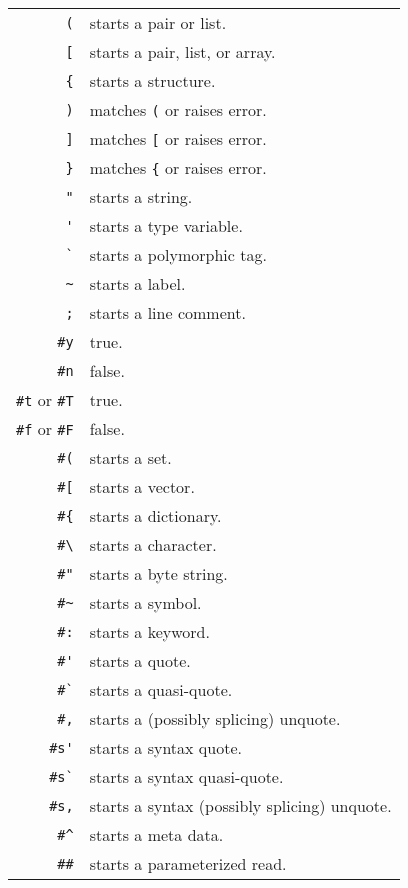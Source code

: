 \begin{tabular}{ r l }
  \lstinline!(! & starts a pair or list. \\
  \lstinline![! & starts a pair, list, or array. \\
  \lstinline!{! & starts a structure. \\
  \lstinline!)! & matches \lstinline!(! or raises error. \\
  \lstinline!]! & matches \lstinline![! or raises error. \\
  \lstinline!}! & matches \lstinline!{! or raises error. \\
  
  \lstinline!"! & starts a string. \\
  \lstinline!'! & starts a type variable. \\
  \lstinline!`! & starts a polymorphic tag. \\
  \lstinline!~! & starts a label. \\
  \lstinline!;! & starts a line comment. \\
  
  \lstinline!#y! & true. \\
  \lstinline!#n! & false. \\
  \lstinline!#t! or \lstinline!#T! & true. \\
  \lstinline!#f! or \lstinline!#F! & false. \\  
  
  \lstinline!#(! & starts a set. \\
  \lstinline!#[! & starts a vector. \\
  \lstinline!#{! & starts a dictionary. \\
  
  \lstinline!#\! & starts a character. \\
  \lstinline!#"! & starts a byte string. \\
  \lstinline!#~! & starts a symbol. \\
  \lstinline!#:! & starts a keyword. \\
  \lstinline!#'! & starts a quote. \\
  \lstinline!#`! & starts a quasi-quote. \\
  \lstinline!#,! & starts a (possibly splicing) unquote. \\
  \lstinline!#s'! & starts a syntax quote. \\
  \lstinline!#s`! & starts a syntax quasi-quote. \\
  \lstinline!#s,! & starts a syntax (possibly splicing) unquote. \\
  \lstinline!#^! & starts a meta data. \\
  \lstinline!##! & starts a parameterized read. \\
  

\end{tabular}
